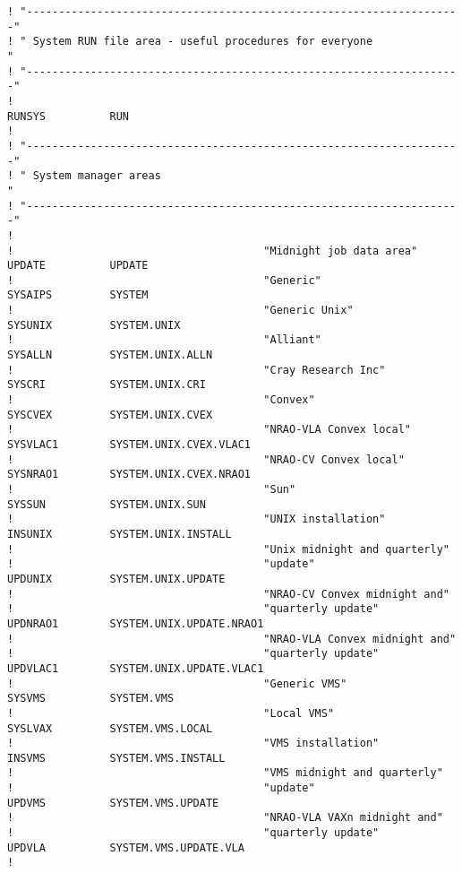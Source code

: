 \begin{verbatim}
! "--------------------------------------------------------------------"
! " System RUN file area - useful procedures for everyone              "
! "--------------------------------------------------------------------"
!
RUNSYS          RUN
!
! "--------------------------------------------------------------------"
! " System manager areas                                               "
! "--------------------------------------------------------------------"
!
!                                       "Midnight job data area"
UPDATE          UPDATE
!                                       "Generic"
SYSAIPS         SYSTEM
!                                       "Generic Unix"
SYSUNIX         SYSTEM.UNIX
!                                       "Alliant"
SYSALLN         SYSTEM.UNIX.ALLN
!                                       "Cray Research Inc"
SYSCRI          SYSTEM.UNIX.CRI
!                                       "Convex"
SYSCVEX         SYSTEM.UNIX.CVEX
!                                       "NRAO-VLA Convex local"
SYSVLAC1        SYSTEM.UNIX.CVEX.VLAC1
!                                       "NRAO-CV Convex local"
SYSNRAO1        SYSTEM.UNIX.CVEX.NRAO1
!                                       "Sun"
SYSSUN          SYSTEM.UNIX.SUN
!                                       "UNIX installation"
INSUNIX         SYSTEM.UNIX.INSTALL
!                                       "Unix midnight and quarterly"
!                                       "update"
UPDUNIX         SYSTEM.UNIX.UPDATE
!                                       "NRAO-CV Convex midnight and"
!                                       "quarterly update"
UPDNRAO1        SYSTEM.UNIX.UPDATE.NRAO1
!                                       "NRAO-VLA Convex midnight and"
!                                       "quarterly update"
UPDVLAC1        SYSTEM.UNIX.UPDATE.VLAC1
!                                       "Generic VMS"
SYSVMS          SYSTEM.VMS
!                                       "Local VMS"
SYSLVAX         SYSTEM.VMS.LOCAL
!                                       "VMS installation"
INSVMS          SYSTEM.VMS.INSTALL
!                                       "VMS midnight and quarterly"
!                                       "update"
UPDVMS          SYSTEM.VMS.UPDATE
!                                       "NRAO-VLA VAXn midnight and"
!                                       "quarterly update"
UPDVLA          SYSTEM.VMS.UPDATE.VLA
!
\end{verbatim}
